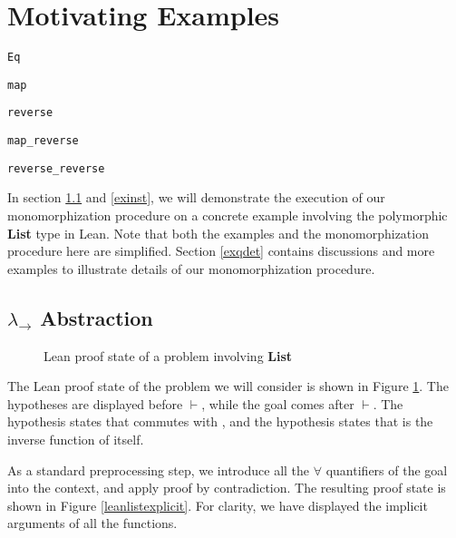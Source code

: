 \section{Motivating Examples} \label{motex}

\begin{lrbox}{\vEq} {\color{hypcolor} \verb|Eq|} \end{lrbox}
\begin{lrbox}{\vmap} {\color{hypcolor} \verb|map|} \end{lrbox}
\begin{lrbox}{\vrev} {\color{hypcolor} \verb|reverse|} \end{lrbox}
\begin{lrbox}{\vmaprev} {\color{hypcolor} \verb|map_reverse|} \end{lrbox}
\begin{lrbox}{\vrevrev} {\color{hypcolor} \verb|reverse_reverse|} \end{lrbox}

In section \ref{exabst} and \ref{exinst}, we will demonstrate the execution of our monomorphization procedure on a
concrete example involving the polymorphic \textbf{List} type in Lean. Note that both
the examples and the monomorphization procedure here are simplified. Section \ref{exqdet} contains
discussions and more examples to illustrate details of our monomorphization procedure.

\subsection{$\lambda_\to$ Abstraction} \label{exabst}

\begin{figure}
  \begin{CenteredBox}
    
  \end{CenteredBox}
  \caption{Lean proof state of a problem involving \textbf{List}} \label{leanlistpretty}
\end{figure}

\noindent The Lean proof state of the problem we will consider is shown in Figure \ref{leanlistpretty}.
The hypotheses are displayed before $\vdash$, while the goal comes after $\vdash$. The hypothesis
\usebox{\vmaprev} states that \usebox{\vmap} commutes with \usebox{\vrev}, and the hypothesis
\usebox{\vrevrev} states that \usebox{\vrev} is the inverse function of itself.

\noindent As a standard preprocessing step, we introduce all the $\forall$ quantifiers
of the goal into the context, and apply proof by contradiction. The resulting proof state
is shown in Figure \ref{leanlistexplicit}.
For clarity, we have displayed the implicit arguments of all the functions.

